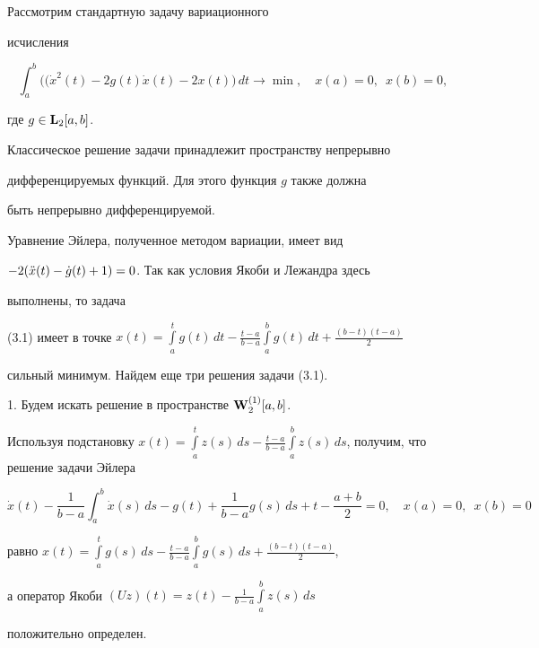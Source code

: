 \begin{exam} Рассмотрим стандартную задачу вариационного


исчисления


\begin{equation}


\int_a^b\big((\Dot x^2(t)-2g(t)\Dot x(t)-2x(t)\big)\,dt


\longrightarrow\min,\quad


x(a)=0,\ \;x(b)=0,


\end{equation}


где $g\in\bold L{}_2[a,b]$.





Классическое решение задачи принадлежит пространству непрерывно


дифференцируемых функций. Для этого функция $g$ также должна


быть непрерывно дифференцируемой.


Уравнение Эйлера, полученное методом вариации, имеет вид


$-2(\Ddot x(t)-\Dot g(t)+1)=0$. Так как условия Якоби и Лежандра здесь


выполнены, то задача


(3.1) имеет в точке $x(t)=\int\limits_a^t g(t)\,dt-


\frac{t-a}{b-a}\int\limits_a^bg(t)\,dt+\frac{(b-t)(t-a)}2$


сильный минимум. Найдем еще три решения задачи (3.1).





1. Будем искать решение в пространстве $\bold W{}_2^{(1)}[a,b]$.


Используя подстановку $x(t)=\int\limits_a^tz(s)\,ds-\frac{t-a}{b-a}


\int\limits_a^bz(s)\,ds$, получим, что решение задачи Эйлера


$$


\Dot x(t)-\frac{1}{b-a}\int_a^b\Dot x(s)\,ds-g(t)+\frac{1}{b-a}


g(s)\,ds+t-\frac{a+b}2=0,\quad x(a)=0,\ \;x(b)=0


$$


равно $x(t)=\int\limits_a^tg(s)\,ds-\frac{t-a}{b-a}\int\limits_a^b


g(s)\,ds+\frac{(b-t)(t-a)}2$,


а оператор Якоби $(Uz)(t)=z(t)-\frac1{b-a}\int\limits_a^bz(s)\,ds$


положительно определен.



\end{exam}
